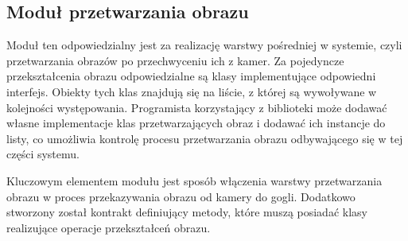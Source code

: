 \documentclass[a4paper,11pt,twoside]{report}
\theoremstyle{definition}
\begin{document}
\subsection{Moduł przetwarzania obrazu}

Moduł ten odpowiedzialny jest za realizację warstwy pośredniej w  systemie, czyli przetwarzania obrazów po przechwyceniu ich z kamer. Za pojedyncze przekształcenia obrazu odpowiedzialne są klasy implementujące odpowiedni interfejs. Obiekty tych klas znajdują się na liście, z której są wywoływane w kolejności występowania. Programista korzystający z biblioteki może dodawać własne implementacje klas przetwarzających obraz i dodawać ich instancje do listy, co umożliwia kontrolę procesu przetwarzania obrazu odbywającego się w tej części systemu. 

Kluczowym elementem modułu jest sposób włączenia warstwy przetwarzania obrazu w proces przekazywania obrazu od kamery do gogli. Dodatkowo stworzony został kontrakt definiujący metody, które muszą posiadać klasy realizujące operacje przekształceń obrazu.

\pagebreak
\end{document}
